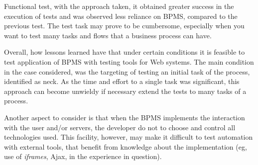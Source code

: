 \documentclass[runningheads,a4paper]{llncs}
\begin{document}
{%
Functional test, with the approach taken, it obtained greater success in the execution of tests and was observed less reliance on BPMS, compared to the previous test. The test task may prove to be cumbersome, especially when you want to test many tasks and flows that a business process can have.


Overall, how lessons learned have that under certain conditions it is feasible to test application of BPMS with testing tools for Web systems. The main condition in the case considered, was the targeting of testing an initial task of the process, identified as neck. As the time and effort to a single task was significant, this approach can become unwieldy if necessary extend the tests to many tasks of a process.



Another aspect to consider is that when the BPMS implements the interaction with the user and/or servers, the developer do not to choose and control all technologies used. This facility, however, may make it difficult to test automation with external tools, that benefit from knowledge about the implementation (eg, use of \emph{iframes}, Ajax, in the experience in question).

}
\end{document}
